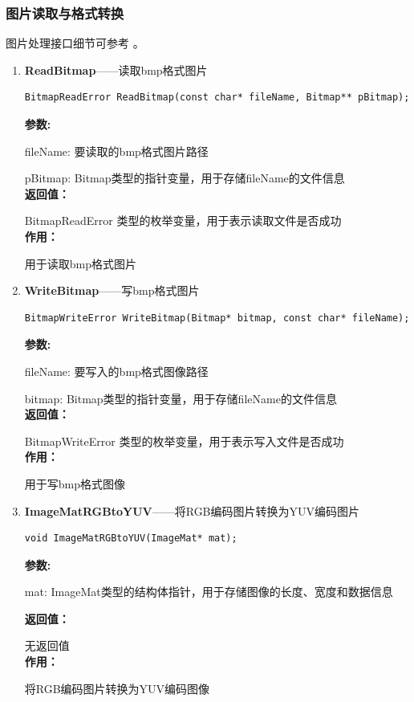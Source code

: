 \documentclass[12pt, a4paper, oneside]{ctexbook}
\begin{document}
		
		\subsubsection{图片读取与格式转换}
		图片处理接口细节可参考 \textbf{}。
		\begin{enumerate}
			\item \textbf{ReadBitmap}——读取bmp格式图片
			\begin{lstlisting}[numbers=none]
BitmapReadError ReadBitmap(const char* fileName, Bitmap** pBitmap);
			\end{lstlisting}
			\textbf{参数:} \par fileName: 要读取的bmp格式图片路径 \par pBitmap: Bitmap类型的指针变量，用于存储fileName的文件信息 \\
			\textbf{返回值：}\par BitmapReadError 类型的枚举变量，用于表示读取文件是否成功\\
			\textbf{作用：}\par 用于读取bmp格式图片\\
			
			\item \textbf{WriteBitmap}——写bmp格式图片
			\begin{lstlisting}[numbers=none]
BitmapWriteError WriteBitmap(Bitmap* bitmap, const char* fileName);
			\end{lstlisting}
			\textbf{参数:} \par fileName: 要写入的bmp格式图像路径 \par bitmap: Bitmap类型的指针变量，用于存储fileName的文件信息 \\
			\textbf{返回值：}\par BitmapWriteError 类型的枚举变量，用于表示写入文件是否成功\\
			\textbf{作用：}\par 用于写bmp格式图像\\
			
			\item \textbf{ImageMatRGBtoYUV}——将RGB编码图片转换为YUV编码图片
			\begin{lstlisting}[numbers=none]
void ImageMatRGBtoYUV(ImageMat* mat);
			\end{lstlisting}
			\textbf{参数:} \par mat: ImageMat类型的结构体指针，用于存储图像的长度、宽度和数据信息\par 
			\textbf{返回值：}\par 无返回值 \\
			\textbf{作用：}\par  将RGB编码图片转换为YUV编码图像\\
			

\end{enumerate}
\end{document}
